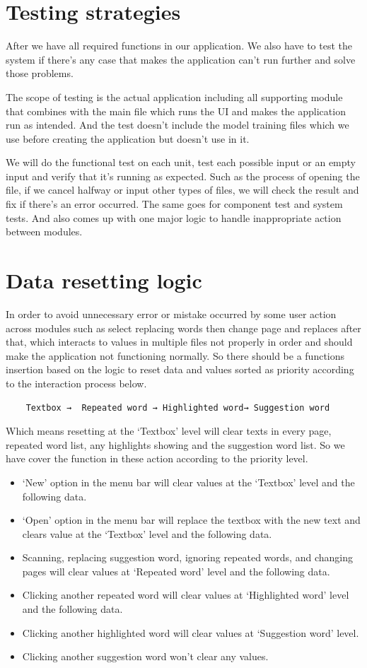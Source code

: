 \documentclass[12pt,oneside,openright,a4paper]{cpe-english-project}
\begin{document}
\section{Testing strategies}
After we have all required functions in our application. We also have to test the system if there’s any case that makes the application can’t run further and solve those problems.

The scope of testing is the actual application including all supporting module that combines with the main file which runs the UI and makes the application run as intended. And the test doesn’t include the model training files which we use before creating the application but doesn’t use in it.

We will do the functional test on each unit, test each possible input or an empty input and verify that it’s running as expected. Such as the process of opening the file, if we cancel halfway or input other types of files, we will check the result and fix if there’s an error occurred. The same goes for component test and system tests. And also comes up with one major logic to handle inappropriate action between modules.

\section{Data resetting logic}
In order to avoid unnecessary error or mistake occurred by some user action across modules such as select replacing words then change page and replaces after that, which interacts to values in multiple files not properly in order and should make the application not functioning normally. So there should be a functions insertion based on the logic to reset data and values sorted as priority according to the interaction process below. 
\begin{verbatim}
	Textbox →  Repeated word → Highlighted word→ Suggestion word
\end{verbatim}
Which means resetting at the ‘Textbox’ level will clear texts in every page, repeated word list, any highlights showing and the suggestion word list. So we have cover the function in these action according to the priority level.

\begin{itemize}
\item ‘New’ option in the menu bar will clear values at the ‘Textbox’ level and the following data.
\item ‘Open’ option in the menu bar will replace the textbox with the new text and clears value at the ‘Textbox’ level and the following data.
\item Scanning, replacing suggestion word, ignoring repeated words, and changing pages will clear values at ‘Repeated word’ level and the following data.
\item Clicking another repeated word will clear values at ‘Highlighted word’ level and the following data.
\item Clicking another highlighted word will clear values at ‘Suggestion word’ level.
\item Clicking another suggestion word won’t clear any values.
\end{itemize}
\end{document}
